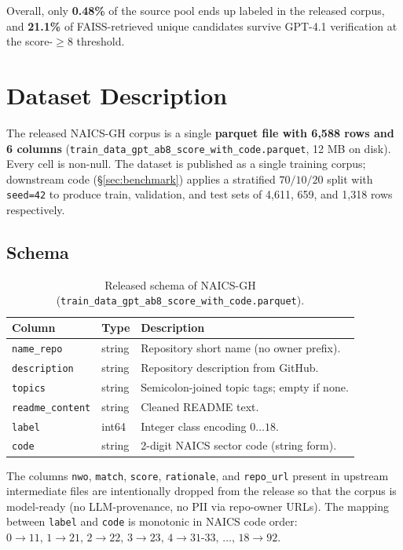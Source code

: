 \documentclass{article}
\begin{document}
Overall, only \textbf{0.48\%} of the source pool ends up labeled in
the released corpus, and \textbf{21.1\%} of FAISS-retrieved unique
candidates survive GPT-4.1 verification at the score-$\geq 8$
threshold.

\section{Dataset Description}
\label{sec:description}

The released NAICS-GH corpus is a single
\textbf{parquet file with 6{,}588 rows and 6 columns}
(\texttt{train\_data\_gpt\_ab8\_score\_with\_code.parquet}, 12 MB on
disk). Every cell is non-null. The dataset is published as a single
training corpus; downstream code (\S\ref{sec:benchmark}) applies a
stratified $70 / 10 / 20$ split with \texttt{seed=42} to produce
train, validation, and test sets of 4{,}611, 659, and 1{,}318 rows
respectively.

\subsection{Schema}

\begin{table}[ht]
\centering
\caption{Released schema of NAICS-GH
(\texttt{train\_data\_gpt\_ab8\_score\_with\_code.parquet}).}
\label{tab:schema}
\small
\begin{tabular}{lll}
\toprule
Column & Type & Description \\
\midrule
\texttt{name\_repo} & string & Repository short name (no owner prefix). \\
\texttt{description} & string & Repository description from GitHub. \\
\texttt{topics} & string & Semicolon-joined topic tags; empty if none. \\
\texttt{readme\_content} & string & Cleaned README text. \\
\texttt{label} & int64 & Integer class encoding $0\ldots 18$. \\
\texttt{code} & string & 2-digit NAICS sector code (string form). \\
\bottomrule
\end{tabular}
\end{table}

The columns \texttt{nwo}, \texttt{match}, \texttt{score},
\texttt{rationale}, and \texttt{repo\_url} present in upstream
intermediate files are intentionally dropped from the release so
that the corpus is model-ready (no LLM-provenance, no PII via
repo-owner URLs). The mapping between \texttt{label} and \texttt{code}
is monotonic in NAICS code order:
$0 \!\to\! 11,\, 1 \!\to\! 21,\, 2 \!\to\! 22,\, 3 \!\to\! 23,\, 4 \!\to\! 31\text{-}33,\, \ldots,\, 18 \!\to\! 92$.
\end{document}
